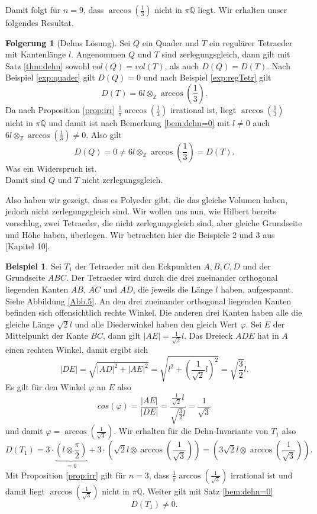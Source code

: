 \documentclass[11pt,titlepage]{article}
\newcommand{\setZ}{\mathbb{Z}}
\newcommand{\setQ}{\mathbb{Q}}
\newcommand{\abs}[1]{{\left| #1 \right|}}
\theoremstyle{definition}
\newtheorem{corollary}[theorem]{Folgerung}
\newtheorem{example}[theorem]{Beispiel}
\theoremstyle{remark}
\begin{document}
	Damit folgt für $n=9$, dass $\arccos\left(\frac{1}{3}\right)$ nicht in $\pi\setQ$ liegt. Wir erhalten unser 
	folgendes Resultat.
	
	\begin{corollary}[Dehns Lösung]
		Sei $Q$ ein Quader und $T$ ein regulärer Tetraeder mit Kantenlänge $l$. Angenommen 
		$Q$ und $T$ sind zerlegungsgleich, dann gilt mit Satz \ref{thm:dehn} sowohl $vol(Q)=vol(T)$, als auch 
		$D(Q)=D(T)$. 
		Nach Beispiel \ref{exp:quader} gilt $D(Q)=0$ und nach Beispiel \ref{exp:regTetr} gilt
		\[D(T)=6l\otimes_{\setZ}\arccos\left(\frac{1}{3}\right).\]
		Da nach Proposition \ref{prop:irr} $\frac{1}{\pi}\arccos\left(\frac{1}{3}\right)$ irrational ist, liegt
		$\arccos\left(\frac{1}{3}\right)$ nicht in $\pi\setQ$ und damit ist nach Bemerkung \ref{bem:dehn=0} 
		mit $l\neq 0$ auch $6l\otimes_{\setZ}\arccos\left(\frac{1}{3}\right)\neq 0$. Also gilt
		\[ D(Q)=0\neq 6l\otimes_{\setZ}\arccos\left(\frac{1}{3}\right)=D(T).\]
		Was ein Widerspruch ist. \\
		Damit sind $Q$ und $T$ nicht zerlegungsgleich.
	\end{corollary}	
	
	Also haben wir gezeigt, dass es Polyeder gibt, die das gleiche 
	Volumen haben, 
	jedoch nicht zerlegungsgleich sind. Wir wollen uns nun, 
	wie Hilbert bereits vorschlug, zwei Tetraeder, die nicht 
	zerlegungsgleich sind, aber gleiche Grundseite und Höhe haben, überlegen.  Wir betrachten hier 
	die Beispiele 2 und 3 aus \cite{Proofsfromthebook}[Kapitel 10].
	
	\begin{example}
		Sei $T_1$ der Tetraeder mit den Eckpunkten $A,B,C,D$ und der Grundseite 
		$ABC$. Der Tetraeder wird durch die drei zueinander orthogonal 
		liegenden Kanten $\overline{AB}$, $\overline{AC}$ und $\overline{AD}$, die jeweils 
		die Länge $l$ haben, aufgespannt. Siehe 
		Abbildung \ref{Abb.5}. 
		An den drei zueinander orthogonal liegenden Kanten befinden sich 
		offensichtlich rechte Winkel. Die anderen drei Kanten haben alle 
		die gleiche Länge $\sqrt{2}l$ und alle Diederwinkel 
		haben den gleich Wert $\varphi$. Sei $E$ der Mittelpunkt der Kante 
		$\overline{BC}$, dann gilt $\abs{AE}=\frac{1}{\sqrt{2}}l$. Das 
		Dreieck $ADE$ hat in $A$ einen rechten Winkel, damit ergibt sich
		\[\abs{DE}=\sqrt{\abs{AD}^2 +\abs{AE}^2}=\sqrt{l^2 +\left(\frac{1}{\sqrt{2}}l\right)^2}=\sqrt{\frac{3}{2}}l.\]
		Es gilt für den Winkel $\varphi$ an $E$ also
		\[cos(\varphi)=\frac{\abs{AE}}{\abs{DE}}=\frac{\frac{1}{\sqrt{2}}l}{\sqrt{\frac{3}{2}}l}=\frac{1}{\sqrt{3}}\]
		und damit $\varphi=\arccos\left(\frac{1}{\sqrt{3}}\right)$. 
		Wir erhalten für die Dehn-Invariante von $T_1$ also
		\[D(T_1)=3\cdot\underbrace{\left(l\otimes\frac{\pi}{2}\right)}_{=0}+3\cdot\left(\sqrt{2}l\otimes\arccos\left(\frac{1}{\sqrt{3}}\right)\right)=\left(3\sqrt{2}l\otimes\arccos\left(\frac{1}{\sqrt{3}}\right)\right).\]
		Mit Proposition \ref{prop:irr} gilt für $n=3$, dass 
		$\frac{1}{\pi}\arccos\left(\frac{1}{\sqrt{3}}\right)$ irrational ist 
		und damit liegt $\arccos\left(\frac{1}{\sqrt{3}}\right)$ nicht 
		in $\pi\setQ$. Weiter gilt mit Satz \ref{bem:dehn=0}  
		\[D(T_1)\neq 0.\]
	\end{example}
	
\end{document}
